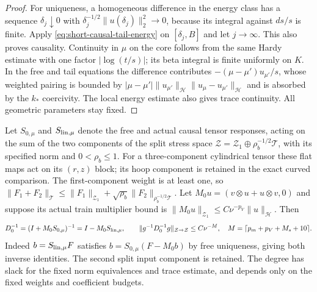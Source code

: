 \begin{proof}
For uniqueness, a homogeneous difference in the energy class has
a sequence $\delta_j\downarrow0$ with
$\delta_j^{-1/2}\|u(\delta_j)\|_2^2\to0$, because its integral
against $ds/s$ is finite. Apply \eqref{eq:short-causal-tail-energy}
on $[\delta_j,B]$ and let $j\to\infty$. This also proves causality.
Continuity in $\mu$ on the core follows from the same Hardy estimate
with one factor $|\log(t/s)|$; its beta integral is finite uniformly
on $K$. In the free and tail equations the difference contributes
$-(\mu-\mu')u_{\mu'}/s$, whose weighted pairing is bounded by
$|\mu-\mu'|\|u_{\mu'}\|_{\mathcal H}\|u_\mu-u_{\mu'}\|_{\mathcal H}$
and is absorbed by the $k_*$ coercivity. The local energy estimate
also gives trace continuity. All geometric parameters stay fixed.
\end{proof}

\begin{corollary}\label{cor:short-polynomial-stress}
Let $S_{0,\mu}$ and $S_{\rm lin,\mu}$ denote the free and actual
causal tensor responses, acting on the sum of the two components of
the split stress space $\mathcal Z=\mathcal Z_1\oplus
\rho_b^{-1/2}\mathcal T$, with its specified norm and $0<\rho_b\le1$.
For a three-component cylindrical tensor these flat maps act on its
$(r,z)$ block; its hoop component is retained in the exact curved
comparison.
The first-component weight is at least one, so
$\|F_1+F_2\|_{\mathcal T}\le\|F_1\|_{\mathcal Z_1}
+\sqrt{\rho_b}\|F_2\|_{\rho_b^{-1/2}\mathcal T}$. Let
$M_0u=(v\otimes u+u\otimes v,0)$ and suppose its actual train
multiplier bound is $\|M_0u\|_{\mathcal Z_1}
\le C\nu^{-p_V}\|u\|_{\mathcal H}$. Then
\[
 D_0^{-1}=(I+M_0S_{0,\mu})^{-1}=I-M_0S_{\rm lin,\mu},\qquad
 \|g^{-1}D_0^{-1}g\|_{\mathcal Z\to\mathcal Z}\le C\nu^{-M},
 \quad M=\lceil p_m+p_V+M_s+10\rceil.
\]
Indeed $b=S_{\rm lin,\mu}F$ satisfies
$b=S_{0,\mu}(F-M_0b)$ by free uniqueness, giving both inverse
identities. The second split input component is retained. The degree
has slack for the fixed norm equivalences and trace estimate, and
depends only on the fixed weights and coefficient budgets.
\end{corollary}
